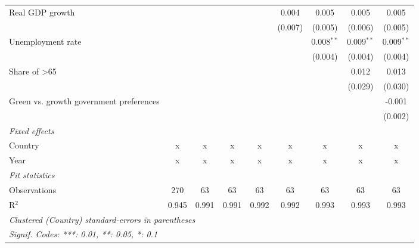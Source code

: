 \begin{table}[htbp]
\begin{tabular}{lcccccccc}
      Real GDP growth                                                                  &         &         &         &             & 0.004        & 0.005        & 0.005        & 0.005\\   
                                                                                       &         &         &         &             & (0.007)      & (0.005)      & (0.006)      & (0.005)\\   
      Unemployment rate                                                                &         &         &         &             &              & 0.008$^{**}$ & 0.009$^{**}$ & 0.009$^{**}$\\   
                                                                                       &         &         &         &             &              & (0.004)      & (0.004)      & (0.004)\\   
      Share of >65                                                                     &         &         &         &             &              &              & 0.012        & 0.013\\   
                                                                                       &         &         &         &             &              &              & (0.029)      & (0.030)\\   
      Green vs. growth government preferences                                          &         &         &         &             &              &              &              & -0.001\\   
                                                                                       &         &         &         &             &              &              &              & (0.002)\\   
      \emph{Fixed effects}\\
      Country                                                                          & x       & x       & x       & x           & x            & x            & x            & x\\  
      Year                                                                             & x       & x       & x       & x           & x            & x            & x            & x\\  
      \midrule \emph{Fit statistics}\\
      Observations                                                                     & 270     & 63      & 63      & 63          & 63           & 63           & 63           & 63\\  
      R$^2$                                                                            & 0.945   & 0.991   & 0.991   & 0.992       & 0.992        & 0.993        & 0.993        & 0.993\\  
      \midrule
      \multicolumn{9}{l}{\emph{Clustered (Country) standard-errors in parentheses}}\\
      \multicolumn{9}{l}{\emph{Signif. Codes: ***: 0.01, **: 0.05, *: 0.1}}\\
   \end{tabular}
\end{table}


